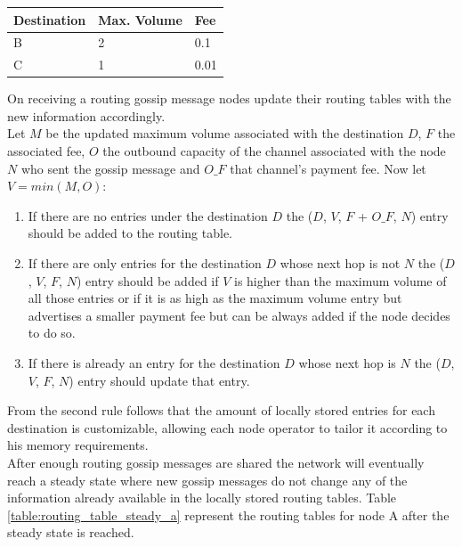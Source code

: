 \begin{table}[H]
\begin{tabular}{|l|l|l|}
\hline
\rowcolor[HTML]{C0C0C0} 
Destination & Max. Volume   & Fee   \\ \hline
B           & 2             & 0.1   \\ \hline
C           & 1             & 0.01  \\ \hline
\end{tabular}
\label{table:routing_gossip}
\end{table}

On receiving a routing gossip message nodes update their routing tables with the new information accordingly. \\
Let $M$ be the updated maximum volume associated with the destination $D$, $F$ the associated fee, $O$ the outbound capacity of the channel associated with the node $N$ who sent the gossip message and $O\_F$ that channel's payment fee. Now let $V = min(M, O)$: \\

\begin{enumerate}

\item If there are no entries under the destination $D$ the ($D$, $V$, $F$ + $O\_F$, $N$) entry should be added to the routing table.
\item If there are only entries for the destination $D$ whose next hop is not $N$ the ($D$, $V$, $F$, $N$) entry should be added if $V$ is higher than the maximum volume of all those entries or if it is as high as the maximum volume entry but advertises a smaller payment fee but can be always added if the node decides to do so.
\item If there is already an entry for the destination $D$ whose next hop is $N$ the ($D$, $V$, $F$, $N$) entry should update that entry.

\end{enumerate}

From the second rule follows that the amount of locally stored entries for each destination is customizable, allowing each node operator to tailor it according to his memory requirements.\\
After enough routing gossip messages are shared the network will eventually reach a steady state where new gossip messages do not change any of the information already available in the locally stored routing tables. Table \ref{table:routing_table_steady_a} represent the routing tables for node A after the steady state is reached.

